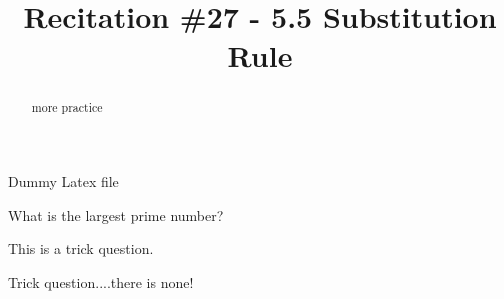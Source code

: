 \documentclass[hints, space]{ximera}
\title{Recitation \#27 - 5.5 Substitution Rule}
\begin{document}
\begin{abstract}    more practice		\end{abstract}
\maketitle

Dummy Latex file


\begin{question}
What is the largest prime number?
	\begin{hint}
	This is a trick question.
	\end{hint}
	\begin{freeResponse}
	Trick question....there is none!
	\end{freeResponse}
\end{question}






								
				
				
	
\end{document}
